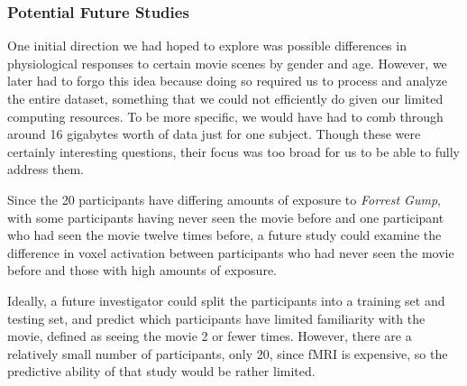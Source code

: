 \documentclass[11pt]{article}
\begin{document}
\subsubsection{Potential Future Studies}

One initial direction we had hoped to explore was possible differences in
physiological responses to certain movie scenes by gender and age. However, we
later had to forgo this idea because doing so required us to process and
analyze the entire dataset, something that we could not efficiently do given
our limited computing resources. To be more specific, we would have had to
comb through around 16 gigabytes worth of data just for one subject. Though
these were certainly interesting questions, their focus was too broad for us
to be able to fully address them.

Since the 20 participants have differing amounts of exposure to \emph{Forrest 
Gump}, with some participants having never seen the movie before and one 
participant who had seen the movie twelve times before, a future study could 
examine the difference in voxel activation between participants who had never 
seen the movie before and those with high amounts of exposure.

Ideally, a future investigator could split the participants into a training
set and testing set, and predict which participants have limited familiarity
with the movie, defined as seeing the movie 2 or fewer times.  However, there
are a relatively small number of participants, only 20, since fMRI is
expensive, so the predictive ability of that study would be rather limited.


\end{document}
